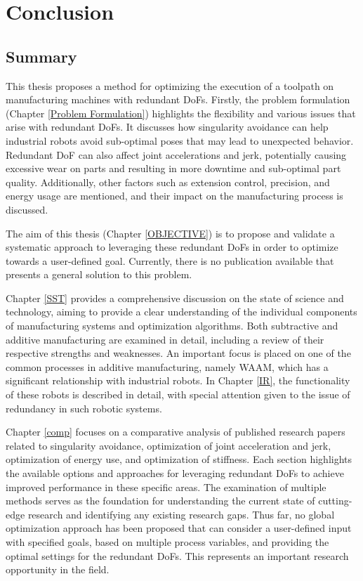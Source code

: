 \chapter{Conclusion}%
\section{Summary}%
This thesis proposes a method for optimizing the execution of a toolpath on manufacturing machines with redundant \acrshort{DoF}s. Firstly, the problem formulation (Chapter \ref{Problem Formulation}) highlights the flexibility and various issues that arise with redundant \acrshort{DoF}s. It discusses how singularity avoidance can help industrial robots avoid sub-optimal poses that may lead to unexpected behavior. Redundant \acrshort{DoF} can also affect joint accelerations and jerk, potentially causing excessive wear on parts and resulting in more downtime and sub-optimal part quality. Additionally, other factors such as extension control, precision, and energy usage are mentioned, and their impact on the manufacturing process is discussed.

The aim of this thesis (Chapter \ref{OBJECTIVE}) is to propose and validate a systematic approach to leveraging these redundant \acrshort{DoF}s in order to optimize towards a user-defined goal. Currently, there is no publication available that presents a general solution to this problem.


Chapter \ref{SST} provides a comprehensive discussion on the state of science and technology, aiming to provide a clear understanding of the individual components of manufacturing systems and optimization algorithms. Both subtractive and additive manufacturing are examined in detail, including a review of their respective strengths and weaknesses. An important focus is placed on one of the common processes in additive manufacturing, namely \acrshort{WAAM}, which has a significant relationship with industrial robots. In Chapter \ref{IR}, the functionality of these robots is described in detail, with special attention given to the issue of redundancy in such robotic systems.

Chapter \ref{comp} focuses on a comparative analysis of published research papers related to singularity avoidance, optimization of joint acceleration and jerk, optimization of energy use, and optimization of stiffness. Each section highlights the available options and approaches for leveraging redundant \acrshort{DoF}s to achieve improved performance in these specific areas. The examination of multiple methods serves as the foundation for understanding the current state of cutting-edge research and identifying any existing research gaps.
Thus far, no global optimization approach has been proposed that can consider a user-defined input with specified goals, based on multiple process variables, and providing the optimal settings for the redundant \acrshort{DoF}s. This represents an important research opportunity in the field.

